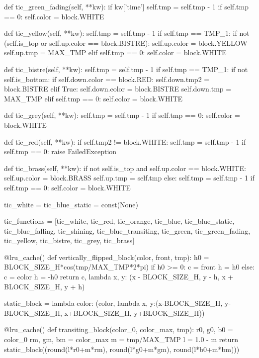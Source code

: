 \documentclass[UTF8]{article}
\begin{document}
\begin{python}
def tic_green_fading(self, **kw):
    if kw['time'] %
        self.tmp = self.tmp - 1
    if self.tmp == 0:
        self.color = block.WHITE
        
def tic_yellow(self, **kw):
    self.tmp = self.tmp - 1
    if self.tmp == TMP_1:
        if not (self.is_top or self.up.color == block.BISTRE):
            self.up.color = block.YELLOW
            self.up.tmp   = MAX_TMP
    elif self.tmp == 0:
        self.color = block.WHITE

def tic_bistre(self, **kw):
    self.tmp = self.tmp - 1
    if self.tmp == TMP_1:
        if not self.is_bottom:
            if self.down.color == block.RED:
                self.down.tmp2 = block.BISTRE
            elif True:
                self.down.color = block.BISTRE
                self.down.tmp   = MAX_TMP
    elif self.tmp == 0:
        self.color = block.WHITE 

def tic_grey(self, **kw):
    self.tmp = self.tmp - 1
    if self.tmp == 0:
        self.color = block.WHITE

def tic_red(self, **kw):
    if self.tmp2 != block.WHITE:
        self.tmp = self.tmp - 1
        if self.tmp == 0:
            raise FailedException

def tic_brass(self, **kw):
    if not self.is_top and self.up.color == block.WHITE:
        self.up.color = block.BRASS
        self.up.tmp = self.tmp
    else:
        self.tmp = self.tmp - 1
        if self.tmp == 0:
            self.color = block.WHITE

tic_white = tic_blue_static = const(None)

tic_functions = [tic_white, tic_red, tic_orange, tic_blue, tic_blue_static,
                 tic_blue_falling, tic_shining, tic_blue_transiting, tic_green,
                 tic_green_fading, tic_yellow, tic_bistre, tic_grey, tic_brass]

@lru_cache()
def vertically_flipped_block(color, front, tmp):
    h0 = BLOCK_SIZE_H*cos(tmp/MAX_TMP*2*pi)
    if h0 >= 0:
        c = front
        h = h0
    else:
        c = color
        h = -h0
    return c, lambda x, y: (x - BLOCK_SIZE_H, y - h, x + BLOCK_SIZE_H, y + h)

static_block = lambda color: (color, lambda x, y:(x-BLOCK_SIZE_H, y-BLOCK_SIZE_H, x+BLOCK_SIZE_H, y+BLOCK_SIZE_H))

@lru_cache()
def transiting_block(color_0, color_max, tmp):
    r0, g0, b0 = color_0
    rm, gm, bm = color_max
    m = tmp/MAX_TMP
    l = 1.0 - m
    return static_block((round(l*r0+m*rm), round(l*g0+m*gm), round(l*b0+m*bm)))


\end{python}
\end{document}
